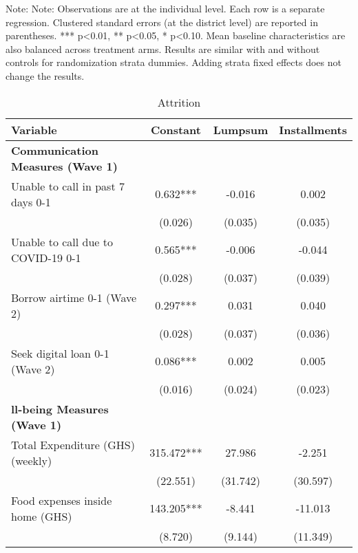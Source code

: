 \begin{ThreePartTable}
\begin{TableNotes}[flushleft]
\footnotesize
\item Note:                                  Note: Observations are at the individual level. Each row is a separate regression. Clustered standard errors (at the district level) are reported in parentheses. *** p<0.01, ** p<0.05, * p<0.10. Mean baseline characteristics are also balanced across treatment arms. Results are similar with and without controls for randomization strata dummies. Adding strata fixed effects does not change the results.                                 
\end{TableNotes}
\begin{table}[tbp]\centering
\def\sym#1{\ifmmode^{#1}\else\(^{#1}\)\fi}
\caption{Attrition}
\begin{tabular}{lccc}
\hline
 Variable & Constant & Lumpsum & Installments \\ [0.1em] 
\hline\hline
\textbf{Communication Measures (Wave 1)} & & & \\ 
 Unable to call in past 7 days 0-1 & 0.632*** & -0.016 & 0.002 \\ [0.1em] 
                   &      (0.026)     &      (0.035)     &      (0.035)     \\ [0.1em] 
 Unable to call due to COVID-19 0-1 & 0.565*** & -0.006 & -0.044 \\ [0.1em] 
                   &      (0.028)     &      (0.037)     &      (0.039)     \\ [0.1em] 
 Borrow airtime 0-1 (Wave 2) & 0.297*** & 0.031 & 0.040 \\ [0.1em] 
                   &      (0.028)     &      (0.037)     &      (0.036)     \\ [0.1em] 
 Seek digital loan 0-1 (Wave 2) & 0.086*** & 0.002 & 0.005 \\ [0.1em] 
                   &      (0.016)     &      (0.024)     &      (0.023)     \\ [0.1em] 
\textbf{ll-being Measures (Wave 1)} & & & \\ 
 Total Expenditure (GHS) (weekly) & 315.472*** & 27.986 & -2.251 \\ [0.1em] 
                   &      (22.551)     &      (31.742)     &      (30.597)     \\ [0.1em] 
 Food expenses inside home (GHS) & 143.205*** & -8.441 & -11.013 \\ [0.1em] 
                   &      (8.720)     &      (9.144)     &      (11.349)     \\ [0.1em] 

\end{tabular}
\end{table}
\end{ThreePartTable}
